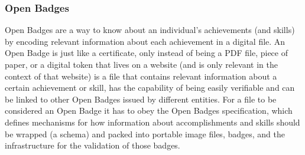 \documentclass[llncsdoc]{llncs}
\begin{document}
\subsubsection{Open Badges}

Open Badges are a way to know about an individual's achievements (and skills) by encoding relevant information about each achievement in a digital file. An Open Badge is just like a certificate, only instead of being a PDF file, piece of paper, or a digital token that lives on a website (and is only relevant in the context of that website) is a file that contains relevant information about a certain achievement or skill, has the capability of being easily verifiable and can be linked to other Open Badges issued by different entities. For a file to be considered an Open Badge it has to obey the Open Badges specification, \cite{Anonymous:B6vGjZ5Q} which defines mechanisms for how information about accomplishments and skills should be wrapped (a schema) and packed into portable image files, badges, and the infrastructure for the validation of those badges.
\end{document}
